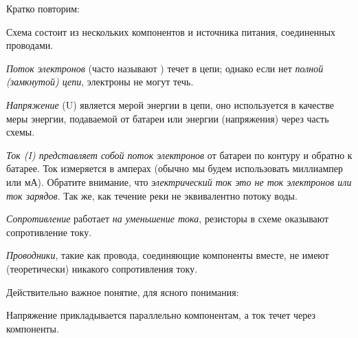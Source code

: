 
Кратко повторим:
\bigskip

Схема состоит из нескольких компонентов и источника питания, соединенных
проводами.

\emph{Поток электронов} (часто называют ) течет в цепи; однако если нет \emph{полной (замкнутой) цепи}, электроны
не могут течь.

\emph{Напряжение} (U) является мерой энергии в цепи, оно используется в качестве
меры энергии, подаваемой от батареи или энергии (напряжения) через часть схемы.

\emph{Ток (I) представляет собой поток электронов} от батареи по контуру и
обратно к батарее. Ток измеряется в амперах (обычно мы будем использовать
миллиампер или мА). Обратите внимание, что \emph{электрический ток это не ток
электронов или ток зарядов}. Так же, как течение реки не эквивалентно потоку
воды.

\emph{Сопротивление} работает \emph{на уменьшение тока}, резисторы в схеме
оказывают сопротивление току.

\emph{Проводники}, такие как провода, соединяющие компоненты вместе, не имеют
(теоретически) никакого сопротивления току.

\bigskip
Действительно важное понятие, для ясного понимания:

Напряжение прикладывается параллельно компонентам, а ток течет через компоненты.
